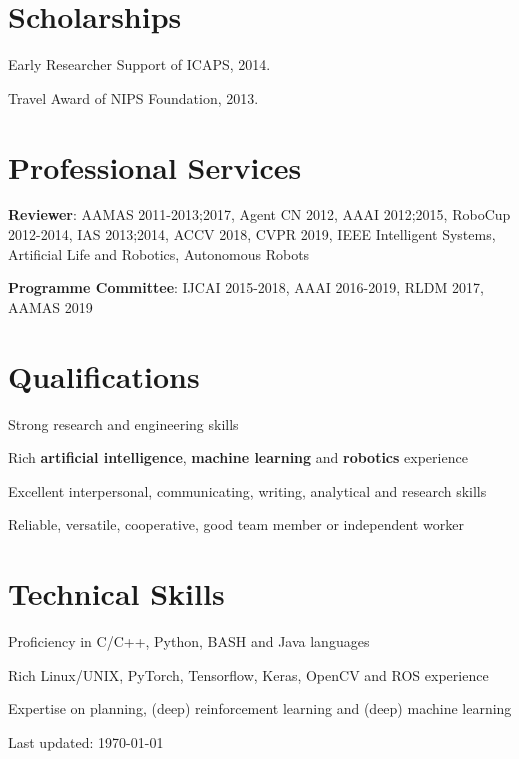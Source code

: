 \documentclass[letterpaper,10pt]{article}
\def\footerlink{}
\renewenvironment{itemize}{
  \begin{list}{}{
    \setlength{\leftmargin}{1.5em}
  }
}{
  \end{list}
}
\begin{document}
\vspace{10pt}
\section*{Scholarships}
\begin{itemize}
	\item Early Researcher Support of ICAPS, 2014.
	\item Travel Award of NIPS Foundation, 2013.
\end{itemize}

\vspace{10pt}
\section*{Professional Services}
\begin{itemize}
	\item \textbf{Reviewer}: AAMAS 2011-2013;2017, Agent CN 2012, AAAI 2012;2015, RoboCup 2012-2014, IAS 2013;2014, ACCV 2018, CVPR 2019, IEEE Intelligent Systems, Artificial Life and Robotics, Autonomous Robots
	\item \textbf{Programme Committee}: IJCAI 2015-2018, AAAI 2016-2019, RLDM 2017, AAMAS 2019
\end{itemize}

\vspace{10pt}
\section*{Qualifications}
\begin{itemize}
	\item Strong research and engineering skills
	\item Rich \textbf{artificial intelligence}, \textbf{machine learning} and \textbf{robotics} experience
	\item Excellent interpersonal, communicating, writing, analytical and research skills
	\item Reliable, versatile, cooperative, good team member or independent worker
\end{itemize}

\vspace{10pt}
\section*{Technical Skills}
\begin{itemize}
	\item Proficiency in C/C++, Python, BASH and Java languages
	\item Rich Linux/UNIX, PyTorch, Tensorflow, Keras, OpenCV and ROS experience
	\item Expertise on planning, (deep) reinforcement learning and (deep) machine learning
\end{itemize}

\bigskip

\begin{center}
  \begin{footnotesize}
    Last updated: \today \\
    \href{\footerlink}{\texttt{\footerlink}}
  \end{footnotesize}
\end{center}
\end{document}
